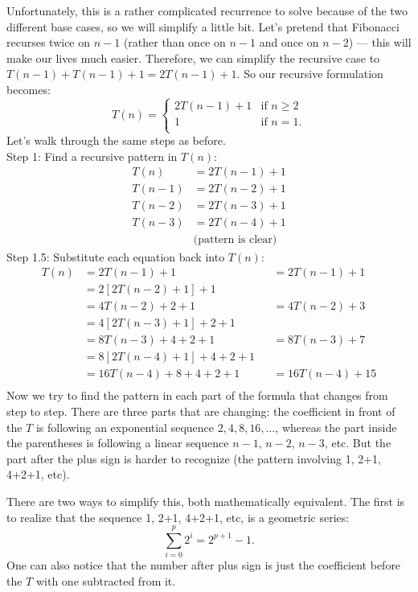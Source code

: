 \documentclass [letterpaper,12pt]{article}
\begin{document}
Unfortunately, this is a rather complicated recurrence to solve because of the two different base cases, so we will simplify
a little bit.  Let's pretend that Fibonacci recurses twice on $n-1$ (rather than once on $n-1$ and once on $n-2$) ---
this will make our lives much easier.  Therefore, we can simplify the recursive case to $T(n-1) + T(n-1)+1=2T(n-1)+1$.
So our recursive formulation becomes:
\[ 
T(n) = \begin{cases}
2T(n-1) + 1 & \text{if } n \geq 2 \\
1 &\text{if } n=1.\\
\end{cases} 
\]
Let's walk through the same steps as before.
\\
Step 1: Find a recursive pattern in $T(n)$:
\begin{align*}
T(n) &= 2T(n-1) + 1 \\
T(n-1) &= 2T(n-2) + 1 \\
T(n-2) &= 2T(n-3) + 1 \\
T(n-3) &= 2T(n-4) + 1 \\
&\text{(pattern is clear)}
\end{align*}
Step 1.5: Substitute each equation back into $T(n)$:
\begin{align*}
T(n) &= 2T(n-1) + 1 &&= 2T(n-1) + 1\\
&= 2\left[2T(n-2) + 1\right] + 1 \\
&= 4T(n-2) + 2 + 1 && = 4T(n-2) + 3\\
&= 4\left[2T(n-3) + 1\right] + 2 + 1 \\
&= 8T(n-3) + 4 + 2 + 1 &&= 8T(n-3) + 7\\
&= 8\left[2T(n-4) + 1\right] + 4 + 2 + 1 \\
&= 16T(n-4) + 8 + 4 + 2 + 1 &&= 16T(n-4) + 15\\
\end{align*}
Now we try to find the pattern in each part of the formula that changes from step to step.  There are three parts
that are changing:   the coefficient in front of the $T$ is following an exponential
sequence $2, 4, 8, 16, \ldots$, whereas the part inside the parentheses is following a linear sequence $n-1$,
$n-2$, $n-3$, etc.  But the part after the plus sign is harder to recognize (the pattern involving 1, 2+1, 4+2+1, etc).

 There are two ways to simplify this, both mathematically equivalent.
The first is to realize that the sequence 1, 2+1, 4+2+1, etc, is a geometric series:
\[ \sum_{i=0}^p 2^i = 2^{p+1}-1.\]
One can also notice that the number after plus sign is just the coefficient before the $T$ with one subtracted from it.
\end{document}
